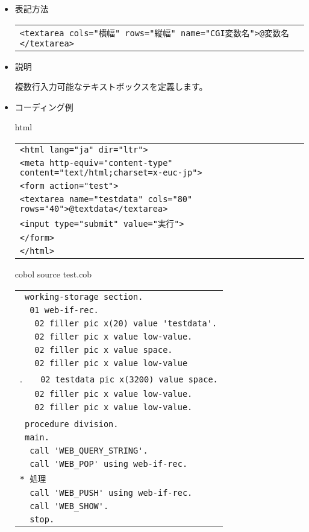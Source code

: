 \begin{itemize}

\item{表記方法}

\begin{tabular}{l}
\verb+<textarea cols="横幅" rows="縦幅" name="CGI変数名">@変数名</textarea>+\\
\end{tabular}

\item{説明}

複数行入力可能なテキストボックスを定義します。

\item{コーディング例}

{\gt html}

\begin{tabular}{|l|}
\hline
\verb+<html lang="ja" dir="ltr">+\\
\verb+<meta http-equiv="content-type" content="text/html;charset=x-euc-jp">+\\
\verb+<form action="test">+\\
\verb+<textarea name="testdata" cols="80" rows="40">@textdata</textarea>+\\
\verb+<input type="submit" value="実行">+\\
\verb+</form>+\\
\verb+</html>+\\
\hline
\end{tabular}

{\gt cobol} source test.cob

\begin{tabular}{|l|}
\hline
\verb+ working-storage section.+\\
\verb+  01 web-if-rec.+\\
\verb+   02 filler pic x(20) value 'testdata'.+\\
\verb+   02 filler pic x value low-value.+\\
\verb+   02 filler pic x value space.+\\
\verb+   02 filler pic x value low-value+\\.
\verb+   02 testdata pic x(3200) value space.+\\
\verb+   02 filler pic x value low-value.+\\
\verb+   02 filler pic x value low-value.+\\
\verb++\\
\verb+ procedure division.+\\
\verb+ main.+\\
\verb+  call 'WEB_QUERY_STRING'.+\\
\verb+  call 'WEB_POP' using web-if-rec.+\\
\verb+* 処理+\\
\verb+  call 'WEB_PUSH' using web-if-rec.+\\
\verb+  call 'WEB_SHOW'.+\\
\verb+  stop.+\\
\hline
\end{tabular}

\end{itemize}
